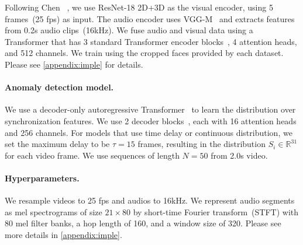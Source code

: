\documentclass[10pt,twocolumn,letterpaper]{article}
\newcommand{\mypar}[1]{\vspace{-3mm}\paragraph{#1}}
\newcommand{\supparxiv}[2]{#2}
\begin{document}
Following Chen \etal~\cite{chen2021audio}, we use ResNet-18 2D+3D\cite{he2016deep, hara2018can} as the visual encoder, using 5 frames~(25 fps) as input. The audio encoder uses VGG-M~\cite{chatfield2014return} and extracts features from 0.2s audio clips~(16kHz).
We fuse audio and visual data using a Transformer that has 3 standard Transformer encoder blocks~\cite{vaswani2017attention}, 4 attention heads, and 512 channels. We train using the cropped faces provided by each dataset. Please see \supparxiv{the supplement}{\cref{appendix:imple}} for details.


\mypar{Anomaly detection model.} 
We use a decoder-only autoregressive Transformer~\cite{liu2018generating,esser2021taming,radford2019language} to learn the distribution over synchronization features. We use 2 decoder blocks~\cite{vaswani2017attention}, each with 16 attention heads and 256 channels. 
For models that use time delay or continuous distribution, we set the maximum delay to be $\tau=15$ frames, resulting in the distribution $S_i \in \mathbb{R}^{31}$ for each video frame. We use sequences of length $N=50$ from 2.0s video.







\mypar{Hyperparameters.} 
We resample videos to 25 fps and audios to 16kHz. We represent audio segments as mel spectrograms of size $21\times80$ by short-time Fourier transform~(STFT) with 80 mel filter banks, a hop length of 160, and a window size of 320. Please see more details in \supparxiv{the supp}{\cref{appendix:imple}}.
\end{document}
